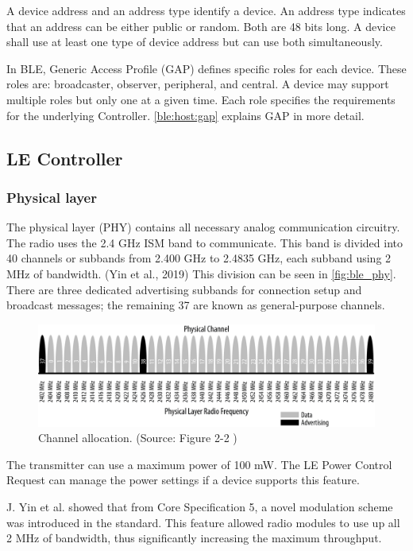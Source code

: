 A device address and an address type identify a device.
An address type indicates that an address can be either public or random.
Both are 48 bits long.
A device shall use at least one type of device address but can use
both simultaneously.

In BLE, Generic Access Profile (GAP) defines specific roles for each device.
These roles are: broadcaster, observer, peripheral, and central.
A device may support multiple roles but only one at a given time.
Each role specifies the requirements for the underlying Controller.
\autoref{ble:host:gap} explains GAP in more detail.

\subsection{LE Controller}
\label{ble:controller}
\subsubsection{Physical layer}
\label{ble:controller:phy}

The physical layer (PHY) contains all necessary analog communication circuitry.
The radio uses the 2.4 GHz ISM band to communicate.
This band is divided into 40 channels or subbands from 2.400 GHz to 2.4835 GHz,
each subband using 2 MHz of bandwidth. (Yin et al., 2019)
This division can be seen in \autoref{fig:ble_phy}.
There are three dedicated advertising subbands for connection setup and
broadcast messages; the remaining 37 are known as general-purpose channels.

\begin{figure}[!ht]
    \centering
    \includegraphics[width=150mm, keepaspectratio]{figures/ble_phy.png}
    \caption{Channel allocation. (Source: Figure 2-2 \cite{Townsend14})}
    \label{fig:ble_phy}
\end{figure}

The transmitter can use a maximum power of 100 mW.
The LE Power Control Request can manage the power settings if a device supports this feature.

J. Yin et al. \cite{Yin:19} showed that from Core Specification 5, a novel
modulation scheme was introduced in the standard.
This feature allowed radio modules to use up all 2 MHz of bandwidth,
thus significantly increasing the maximum throughput.


